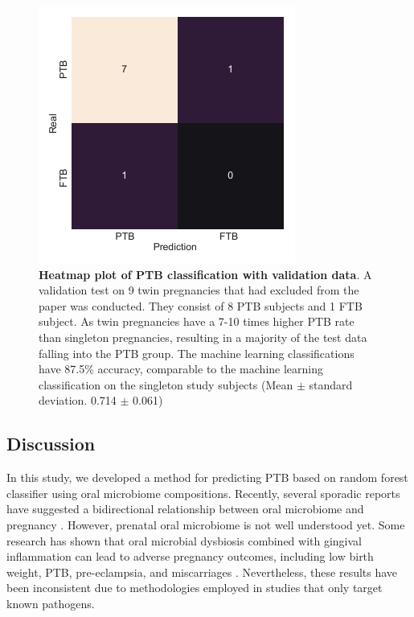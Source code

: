\documentclass[11pt, a4paper, onecolumn, oneside]{report}
\begin{document}
            \begin{figure}[p]
                \centering
                \includegraphics[width=12 cm]{Figures/PTB/FigS3-validation}
                \caption[Heatmap plot of PTB classification with validation data]{\textbf{Heatmap plot of PTB classification with validation data}. A validation test on 9 twin pregnancies that had excluded from the paper was conducted. They consist of 8 PTB subjects and 1 FTB subject. As twin pregnancies have a 7-10 times higher PTB rate than singleton pregnancies, resulting in a majority of the test data falling into the PTB group. The machine learning classifications have 87.5\% accuracy, comparable to the machine learning classification on the singleton study subjects (Mean $\pm$ standard deviation. 0.714 $\pm$ 0.061)}
                \label{fig:PTB-validation}
            \end{figure}
            \clearpage
        \newpage

        \subsection{Discussion}
            In this study, we developed a method for predicting PTB based on random forest classifier using oral microbiome compositions. Recently, several sporadic reports have suggested a bidirectional relationship between oral microbiome and pregnancy \cite{PTB-mechanism-3}. However, prenatal oral microbiome is not well understood yet. Some research has shown that oral microbial dysbiosis combined with gingival inflammation can lead to adverse pregnancy  outcomes, including low birth weight, PTB, pre-eclampsia, and miscarriages \cite{PTB-mechanism-6}. Nevertheless, these results have been inconsistent due to methodologies employed in studies that only target known pathogens.
\end{document}
